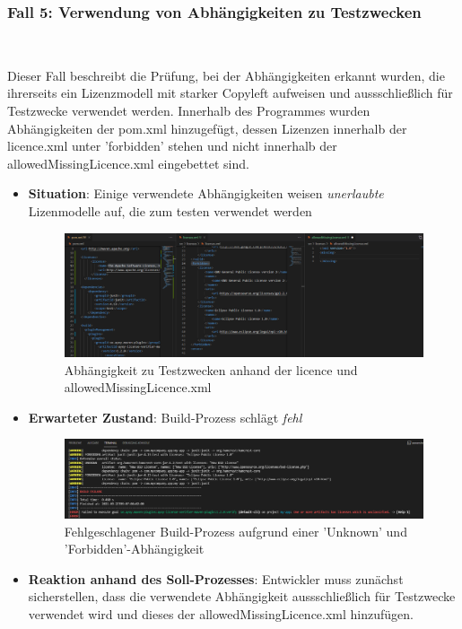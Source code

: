 \subsubsection{Fall 5: Verwendung von Abhängigkeiten zu Testzwecken} $~$

Dieser Fall beschreibt die Prüfung, bei der Abhängigkeiten erkannt wurden, die ihrerseits ein Lizenzmodell mit starker Copyleft aufweisen und aussschließlich für Testzwecke verwendet werden. Innerhalb des Programmes wurden Abhängigkeiten der pom.xml hinzugefügt, dessen Lizenzen innerhalb der licence.xml unter 'forbidden' stehen und nicht innerhalb der allowedMissingLicence.xml eingebettet sind. 

\begin{itemize}
    \item \textbf{Situation}: Einige verwendete Abhängigkeiten weisen \textit{unerlaubte} Lizenmodelle auf, die zum testen verwendet werden
    
    \begin{figure}[h]
        \centering
        \includegraphics[scale=0.4]{Bilder/Fall5Situation.png}
        \caption{Abhängigkeit zu Testzwecken anhand der licence und allowedMissingLicence.xml}
    \end{figure}

    \item \textbf{Erwarteter Zustand}: Build-Prozess schlägt \textit{fehl} 

    \begin{figure}[h]
        \centering
        \includegraphics[scale=0.4]{Bilder/Fall5Zustand.png}
        \caption{Fehlgeschlagener Build-Prozess aufgrund einer 'Unknown' und 'Forbidden'-Abhängigkeit}
    \end{figure}

    \item \textbf{Reaktion anhand des Soll-Prozesses}: Entwickler muss zunächst sicherstellen, dass die verwendete Abhängigkeit aussschließlich für Testzwecke verwendet wird und dieses der allowedMissingLicence.xml hinzufügen. 
\end{itemize}
